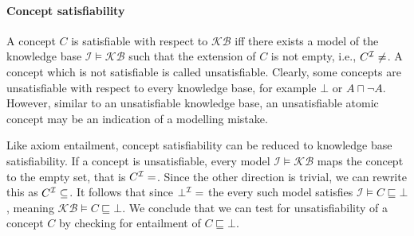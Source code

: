 \paragraph{Concept satisfiability}

A concept $C$ is satisfiable with respect to $\mathcal{KB}$ iff there exists a model of the knowledge base $\mathcal{I} \vDash \mathcal{KB}$ such that the extension of $C$ is not empty, i.e., $C^\mathcal{I} \not= \empty$. A concept which is not satisfiable is called unsatisfiable. Clearly, some concepts are unsatisfiable with respect to every knowledge base, for example $\bot$ or $A \sqcap \lnot A$. However, similar to an unsatisfiable knowledge base, an unsatisfiable atomic concept may be an indication of a modelling mistake.

Like axiom entailment, concept satisfiability can be reduced to knowledge base satisfiability. If a concept is unsatisfiable, every model $\mathcal{I} \vDash \mathcal{KB}$ maps the concept to the empty set, that is $C^\mathcal{I} = \empty$. Since the other direction is trivial, we can rewrite this as $C^\mathcal{I} \subseteq \empty$. It follows that since $\bot^\mathcal{I} = \empty$ the every such model satisfies $\mathcal{I} \vDash C \sqsubseteq \bot$, meaning $\mathcal{KB} \vDash C \sqsubseteq \bot$. We conclude that we can test for unsatisfiability of a concept $C$ by checking for entailment of $C \sqsubseteq \bot$.
